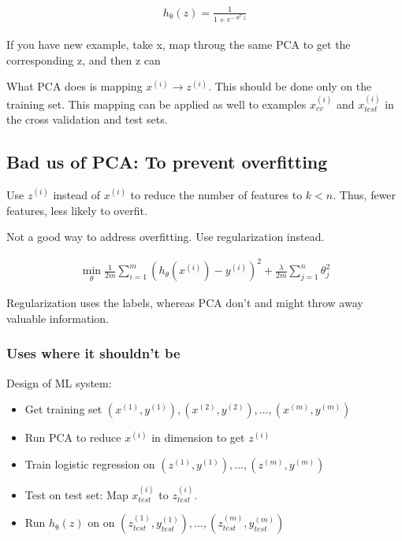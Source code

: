 \begin{align*}
h_{\uptheta}(z) = \frac{1}{1+e^{-\uptheta^{T}z}}
\end{align*}

If you have new example, take x, map throug the same PCA to get the
corresponding z, and then z can

What PCA does is mapping \(x^{(i)} \rightarrow z^{(i)}\). This should be
done only on the training set. This mapping can be applied as well to
examples \(x^{(i)}_{cv}\) and \(x^{(i)}_{test}\) in the cross validation
and test sets.

\hypertarget{bad-us-of-pca-to-prevent-overfitting}{%
\subsection{Bad us of PCA: To prevent
overfitting}\label{bad-us-of-pca-to-prevent-overfitting}}

Use \(z^{(i)}\) instead of \(x^{(i)}\) to reduce the number of features
to \(k<n\). Thus, fewer features, less likely to overfit.

Not a good way to address overfitting. Use regularization instead.

\begin{align*}
\min_{\theta} \frac{1}{2m} \sum^{m}_{i=1}(h_{\theta}(x^{(i)}) - y^{(i)})^2 + \frac{\lambda}{2m}\sum^{n}_{j=1}\theta^2_j
\end{align*}

Regularization uses the labels, whereas PCA don't and might throw away
valuable information.

\hypertarget{uses-where-it-shouldnt-be}{%
\subsubsection{Uses where it shouldn't
be}\label{uses-where-it-shouldnt-be}}

Design of ML system:

\begin{itemize}
\item
  Get training set
  \((x^{(1)},y^{(1)}),(x^{(2)},y^{(2)}),\dots,(x^{(m)},y^{(m)})\)
\item
  Run PCA to reduce \(x^{(i)}\) in dimension to get \(z^{(i)}\)
\item
  Train logistic regression on
  \((z^{(1)},y^{(1)}),\dots,(z^{(m)},y^{(m)})\)
\item
  Test on test set: Map \(x^{(i)}_{test}\) to \(z^{(i)}_{test}\).
\item
  Run \(h_{\uptheta}(z)\) on on
  \((z^{(1)}_{test},y^{(1)}_{test}),\dots,(z^{(m)}_{test},y^{(m)}_{test})\)
\end{itemize}

